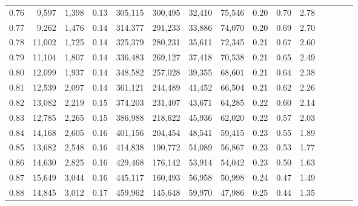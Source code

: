 \begin{tabular}{rrrcrrrrrrrrrrr}
0.76 &   9,597 &  1,398 &                                       0.13 &  305,115 &  300,495 &   32,410 &   75,546 &  0.20 &  0.70 &                         2.78 \\
0.77 &   9,262 &  1,476 &                                       0.14 &  314,377 &  291,233 &   33,886 &   74,070 &  0.20 &  0.69 &                         2.70 \\
0.78 &  11,002 &  1,725 &                                       0.14 &  325,379 &  280,231 &   35,611 &   72,345 &  0.21 &  0.67 &                         2.60 \\
0.79 &  11,104 &  1,807 &                                       0.14 &  336,483 &  269,127 &   37,418 &   70,538 &  0.21 &  0.65 &                         2.49 \\
0.80 &  12,099 &  1,937 &                                       0.14 &  348,582 &  257,028 &   39,355 &   68,601 &  0.21 &  0.64 &                         2.38 \\
0.81 &  12,539 &  2,097 &                                       0.14 &  361,121 &  244,489 &   41,452 &   66,504 &  0.21 &  0.62 &                         2.26 \\
0.82 &  13,082 &  2,219 &                                       0.15 &  374,203 &  231,407 &   43,671 &   64,285 &  0.22 &  0.60 &                         2.14 \\
0.83 &  12,785 &  2,265 &                                       0.15 &  386,988 &  218,622 &   45,936 &   62,020 &  0.22 &  0.57 &                         2.03 \\
0.84 &  14,168 &  2,605 &                                       0.16 &  401,156 &  204,454 &   48,541 &   59,415 &  0.23 &  0.55 &                         1.89 \\
0.85 &  13,682 &  2,548 &                                       0.16 &  414,838 &  190,772 &   51,089 &   56,867 &  0.23 &  0.53 &                         1.77 \\
0.86 &  14,630 &  2,825 &                                       0.16 &  429,468 &  176,142 &   53,914 &   54,042 &  0.23 &  0.50 &                         1.63 \\
0.87 &  15,649 &  3,044 &                                       0.16 &  445,117 &  160,493 &   56,958 &   50,998 &  0.24 &  0.47 &                         1.49 \\
0.88 &  14,845 &  3,012 &                                       0.17 &  459,962 &  145,648 &   59,970 &   47,986 &  0.25 &  0.44 &                         1.35 \\

\end{tabular}
